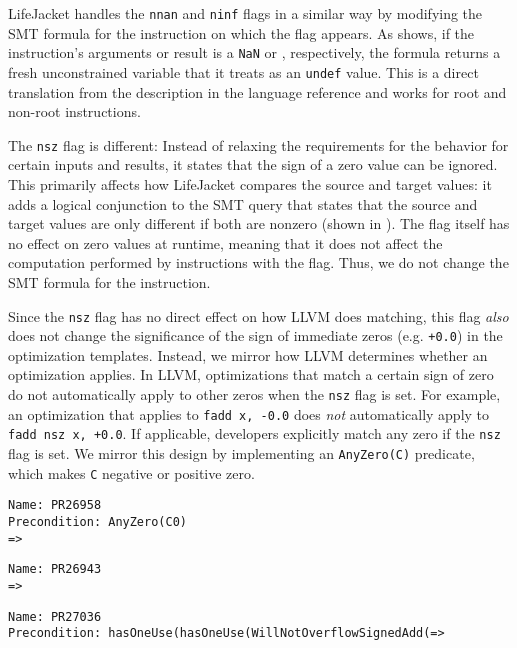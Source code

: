 \documentclass[preprint, numbers]{sigplanconf}
\newcommand{\xxx}{LifeJacket}
\begin{document}
\xxx{} handles the \texttt{nnan} and \texttt{ninf} flags in a similar way by
modifying the SMT formula for the instruction on which the flag appears. As
 shows, if the instruction's arguments or result is a
\texttt{NaN} or , respectively, the formula returns a fresh
unconstrained variable that it treats as an \texttt{undef} value. This is a
direct translation from the description in the language reference and works for
root and non-root instructions.

The \texttt{nsz} flag is different: Instead of relaxing the requirements for
the behavior for certain inputs and results, it states that the sign of a zero
value can be ignored. This primarily affects how \xxx{} compares the source and
target values: it adds a logical conjunction to the SMT query that states that
the source and target values are only different if both are nonzero (shown in
). The flag itself has no effect on zero values at runtime,
meaning that it does not affect the computation performed by instructions with
the flag. Thus, we do not change the SMT formula for the instruction.

Since the \texttt{nsz} flag has no direct effect on how LLVM does matching,
this flag \emph{also} does not change the significance of the sign of immediate
zeros (e.g. \texttt{+0.0}) in the optimization templates. Instead, we mirror
how LLVM determines whether an optimization applies. In LLVM, optimizations
that match a certain sign of zero do not automatically apply to other zeros
when the \texttt{nsz} flag is set. For example, an optimization that applies to
\texttt{fadd x, -0.0} does \emph{not} automatically apply to \texttt{fadd nsz
x, +0.0}. If applicable, developers explicitly match any zero if the
\texttt{nsz} flag is set.  We mirror this design by implementing an
\texttt{AnyZero(C)} predicate, which makes \texttt{C} negative or positive
zero.

\begin{figure*}
\centering
\small

\begin{minipage}[t]{5cm}
\begin{Verbatim}
Name: PR26958
Precondition: AnyZero(C0)
=>
\end{Verbatim}
\end{minipage} \begin{minipage}[t]{5cm}
\begin{Verbatim}
Name: PR26943
=>
\end{Verbatim}
\end{minipage} \begin{minipage}[t]{5cm}
\begin{Verbatim}
Name: PR27036
Precondition: hasOneUse(hasOneUse(WillNotOverflowSignedAdd(=>
\end{Verbatim}
\end{minipage}

\caption{New bugs in LLVM 3.7.1 found by \xxx{}.}
\label{fig:bugs}
\end{figure*}
\end{document}
